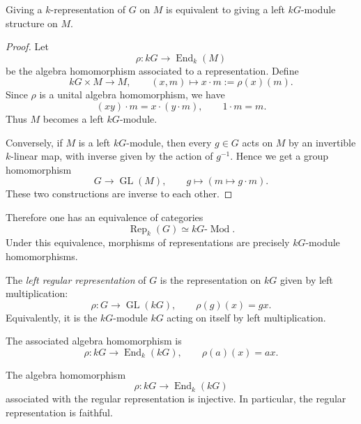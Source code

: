 \begin{proposition}
    Giving a \(k\)-representation of \(G\) on \(M\) is equivalent to giving a
    left \(kG\)-module structure on \(M\).
\end{proposition}

\begin{proof}
    Let
    \[
        \rho:kG\longrightarrow \operatorname{End}_k(M)
    \]
    be the algebra homomorphism associated to a representation. Define
    \[
        kG\times M\longrightarrow M,
        \qquad
        (x,m)\longmapsto x\cdot m:=\rho(x)(m).
    \]
    Since \(\rho\) is a unital algebra homomorphism, we have
    \[
        (xy)\cdot m
        =
        x\cdot (y\cdot m),
        \qquad
        1\cdot m=m.
    \]
    Thus \(M\) becomes a left \(kG\)-module.

    Conversely, if \(M\) is a left \(kG\)-module, then every \(g\in G\) acts on
    \(M\) by an invertible \(k\)-linear map, with inverse given by the action of
    \(g^{-1}\). Hence we get a group homomorphism
    \[
        G\longrightarrow \operatorname{GL}(M),
        \qquad
        g\longmapsto (m\mapsto g\cdot m).
    \]
    These two constructions are inverse to each other.
\end{proof}

Therefore one has an equivalence of categories
\[
    \operatorname{Rep}_k(G)
    \simeq
    kG\text{-}\operatorname{Mod}.
\]
Under this equivalence, morphisms of representations are precisely
\(kG\)-module homomorphisms.

\begin{definition}
    The \emph{left regular representation} of \(G\) is the representation on
    \(kG\) given by left multiplication:
    \[
        \rho:G\longrightarrow \operatorname{GL}(kG),
        \qquad
        \rho(g)(x)=gx.
    \]
    Equivalently, it is the \(kG\)-module \(kG\) acting on itself by left
    multiplication.
\end{definition}

The associated algebra homomorphism is
\[
    \rho:kG\longrightarrow \operatorname{End}_k(kG),
    \qquad
    \rho(a)(x)=ax.
\]

\begin{lemma}
    The algebra homomorphism
    \[
        \rho:kG\longrightarrow \operatorname{End}_k(kG)
    \]
    associated with the regular representation is injective. In particular, the
    regular representation is faithful.
\end{lemma}

